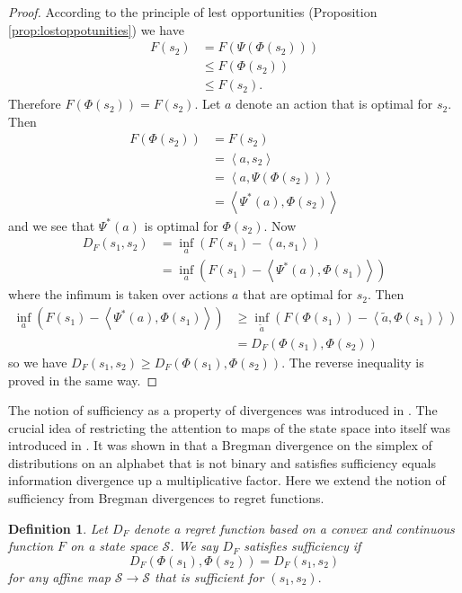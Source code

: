 \documentclass[10pt,a4paper,draft]{article}
\newtheorem{Definition}{Definition}
\begin{document}
\begin{proof}
According to the principle of lest opportunities (Proposition \ref{prop:lostoppotunities}) we have
\begin{align*}
F\left(s_{2}\right) &
=F\left(\Psi\left(\Phi\left(s_{2}\right)\right)\right)\\
 & \leq F\left(\Phi\left(s_{2}\right)\right)\\
 & \leq F\left(s_{2}\right).
\end{align*}
Therefore
$F\left(\Phi\left(s_{2}\right)\right)=F\left(s_{2}\right).$
Let $a$ denote an action that is optimal for $s_{2}.$ Then
\begin{align*}
F\left(\Phi\left(s_{2}\right)\right) & =F\left(s_{2}\right)\\
 & =\left\langle a,s_{2}\right\rangle \\
& =\left\langle
a,\Psi\left(\Phi\left(s_{2}\right)\right)\right\rangle \\
& =\left\langle \Psi^*(a),\Phi\left(s_{2}\right)\right\rangle\end{align*}
and we see that $\Psi^*(a)$ is optimal for
$\Phi\left(s_{2}\right).$
Now
\begin{align*}
D_{F}\left(s_{1},s_{2}\right) &
=\inf_{a}\left(F\left(s_{1}\right)-\left\langle
a,s_{1}\right\rangle \right)\\
& =\inf_{a}\left(F\left(s_{1}\right)-\left\langle
\Psi^*(a),\Phi\left(s_{1}\right)\right\rangle \right)
\end{align*}
where the infimum is taken over actions $a$ that are optimal for $s_{2}.$ Then 
\begin{align*}
\inf_{a}\left(F\left(s_{1}\right)-\left\langle
\Psi^*(a),\Phi\left(s_{1}\right)\right\rangle \right) &
\geq\inf_{\tilde{a}}\left(F\left(\Phi\left(s_{1}\right)\right)-\left\langle
\tilde{a},\Phi\left(s_{1}\right)\right\rangle \right)\\
&
=D_{F}\left(\Phi\left(s_{1}\right),\Phi\left(s_{2}\right)\right)
\end{align*}
so we have $D_{F}\left(s_{1},s_{2}\right)\geq
D_{F}\left(\Phi\left(s_{1}\right),\Phi\left(s_{2}\right)\right).$
The reverse inequality is proved in the same way.
\end{proof}
The notion of sufficiency as a property of divergences was
introduced in \cite{Harremoes2007a}. The crucial idea of restricting the
attention to maps of the state space into itself was introduced
in \cite{Jiao2014}. It was shown in \cite{Jiao2014} that a Bregman
divergence on the simplex of distributions on an alphabet that
is not binary and satisfies sufficiency equals information divergence up a multiplicative
factor. Here we extend the notion of sufficiency from Bregman
divergences to regret functions.
\begin{Definition}
Let $D_F$ denote a regret function based on a convex and continuous function $F$ on a state space ${\mathcal S}$. We say $D_{F}$ satisfies \emph{sufficiency} if 
\[
D_{F}\left(\Phi\left(s_{1}\right),\Phi\left(s_{2}\right)\right)=D_{F}\left(s_{1},s_{2}\right)
\]
for any affine map $\mathcal{S}\to\mathcal{S}$ that
is sufficient for $\left(s_{1},s_{2}\right).$ 
\end{Definition}
\end{document}

